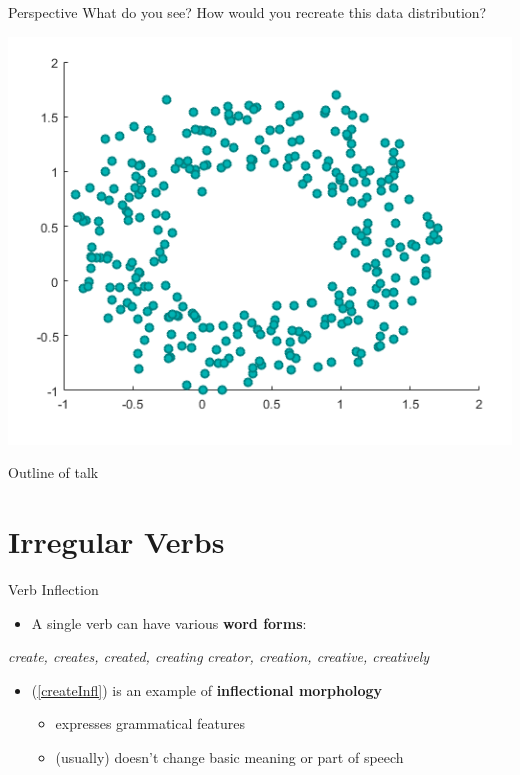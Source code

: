 \documentclass[10pt, compress]{beamer}
\begin{document}
\begin{frame}{Perspective}
	What do you see? How would you recreate this data distribution?
	\begin{center}
		\includegraphics[width=.8\textwidth]{images/circleplot.png}
	\end{center}
\end{frame}

\begin{frame}{Outline of talk}
	\tableofcontents
\end{frame}


\section{Irregular Verbs}
\begin{frame}{Verb Inflection}
	\begin{itemize}
		\item A single verb can have various {\bf word forms}:
	\end{itemize}

	\begin{exe}
			\begin{xlist}
			\ex\label{createInfl} \emph{create, creates, created, creating}
			\ex\label{createDer} \emph{creator, creation, creative, creatively}
		\end{xlist}
	\end{exe}

	\begin{itemize}
		\item (\ref{createInfl}) is an example of {\bf inflectional morphology}
		\begin{itemize}
			\item expresses grammatical features
			\item (usually) doesn't change basic meaning or part of speech
		\end{itemize}
	\end{itemize}
\end{frame}
\end{document}
